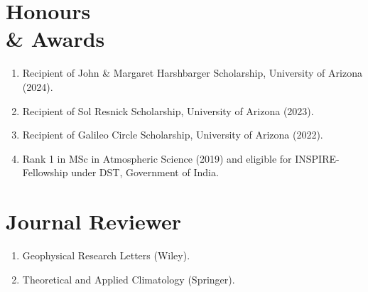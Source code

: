 \documentclass[margin,line]{resume}
\begin{document}
\begin{resume}
		\vspace*{-3mm}
				
		\section{\mysidestyle \textbf{\textcolor{sep}{Honours \\\& Awards}}}
		\begin{enumerate}[topsep=0.1pt, partopsep=1pt, itemsep=0.1pt, parsep=0.1pt, leftmargin=12pt,label=\roman{*})]
			\item Recipient of John \& Margaret Harshbarger Scholarship, University of Arizona (2024).
			\item Recipient of Sol Resnick Scholarship, University of Arizona (2023).
			\item Recipient of Galileo Circle Scholarship, University of Arizona (2022).
			\item Rank 1 in MSc in Atmospheric Science (2019) and eligible for INSPIRE-Fellowship under DST, Government of India.
			
		\end{enumerate} 
		\vspace*{-3mm}
	
		\section{\mysidestyle \textbf{\textcolor{sep}{Journal Reviewer}}}
		\begin{enumerate}[topsep=0.1pt, partopsep=1pt, itemsep=0.1pt, parsep=0.1pt, leftmargin=12pt,label=\roman{*})]
			\item Geophysical Research Letters (Wiley).
			\item Theoretical and Applied Climatology (Springer).
			

\end{enumerate}
\end{resume}
\end{document}
